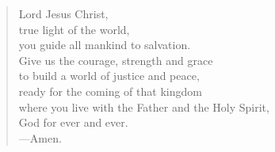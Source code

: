 \prayer

\setlength{\leftmargini}{\prayerleftmargini}

\begin{verse}
Lord Jesus Christ,\\
true light of the world,\\
you guide all mankind to salvation.\\
Give us the courage, strength and grace\\
to build a world of justice and peace,\\
ready for the coming of that kingdom\\
where you live with the Father and the Holy Spirit,\\
God for ever and ever.\\
{\color{red}---\thinspace}Amen.
\end{verse}

\setlength{\leftmargini}{\defleftmargini}